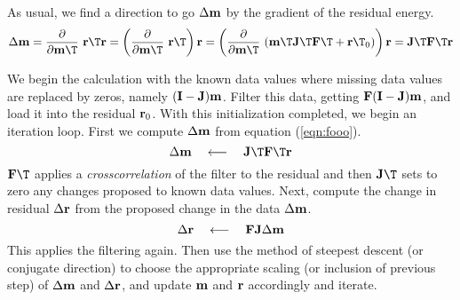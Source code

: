 As usual, we find a direction to go $\Delta \bold m$
by the gradient of the residual energy.
\begin{equation}
\Delta\bold m
= \frac{\partial }{\partial \bold m\T}\ \bold r\T\bold r
= \left( \frac{\partial }{\partial \bold m\T} \ \bold r\T \right) \bold r
= \left( \frac{\partial }{\partial \bold m\T} \
(\bold m\T\bold J\T\bold F\T + \bold r\T_0)                 \right) \bold r
=  \bold J\T \bold F\T \bold r
\label{eqn:fooo}
\end{equation}

\par
We begin the calculation with
the known data values where missing data values are replaced by zeros, namely
$(\bold I-\bold J)\bold m$.
Filter this data,
getting $\bold F(\bold I-\bold J)\bold m$,
and load it into the residual $\bold r_0$.
With this initialization completed,
we begin an iteration loop.
First we compute $\Delta \bold m$ from equation (\ref{eqn:fooo}).
\begin{equation}
\Delta\bold m \quad\longleftarrow\quad \bold J\T \bold F\T \bold r
\end{equation}
$\bold F\T$ applies a {\it crosscorrelation} of the filter to the residual
and then $\bold J\T$ sets to zero any changes proposed to known data values.
Next, compute the change in residual $\Delta\bold r$
from the proposed change in the data $\Delta\bold m$.
\begin{equation}
\Delta\bold r \quad \longleftarrow \quad \bold F \bold J \Delta \bold m
\label{eqn:lastmistheory}
\end{equation}
This applies the filtering again.
Then use the method of steepest descent (or conjugate direction)
to choose the appropriate scaling (or inclusion of previous step)
of $\Delta \bold m$ and $\Delta \bold r$,
and update $\bold m$ and $\bold r$ accordingly
and iterate.

